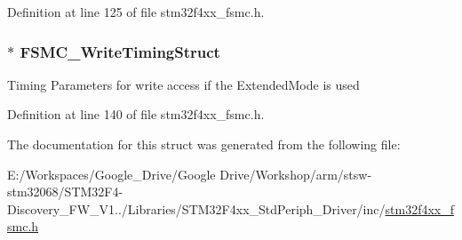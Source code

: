 Definition at line 125 of file stm32f4xx\-\_\-fsmc.\-h.

\hypertarget{struct_f_s_m_c___n_o_r_s_r_a_m_init_type_def_a1fbd19341b882de69c3026234eff037a}{
\subsubsection[{F\-S\-M\-C\-\_\-\-Write\-Timing\-Struct}]{$\ast$ F\-S\-M\-C\-\_\-\-Write\-Timing\-Struct}}\label{struct_f_s_m_c___n_o_r_s_r_a_m_init_type_def_a1fbd19341b882de69c3026234eff037a}
Timing Parameters for write access if the Extended\-Mode is used 

Definition at line 140 of file stm32f4xx\-\_\-fsmc.\-h.



The documentation for this struct was generated from the following file\-:\begin{DoxyCompactItemize}
\item 
E\-:/\-Workspaces/\-Google\-\_\-\-Drive/\-Google Drive/\-Workshop/arm/stsw-\/stm32068/\-S\-T\-M32\-F4-\/\-Discovery\-\_\-\-F\-W\-\_\-\-V1../\-Libraries/\-S\-T\-M32\-F4xx\-\_\-\-Std\-Periph\-\_\-\-Driver/inc/\hyperlink{stm32f4xx__fsmc_8h}{stm32f4xx\-\_\-fsmc.\-h}\end{DoxyCompactItemize}
